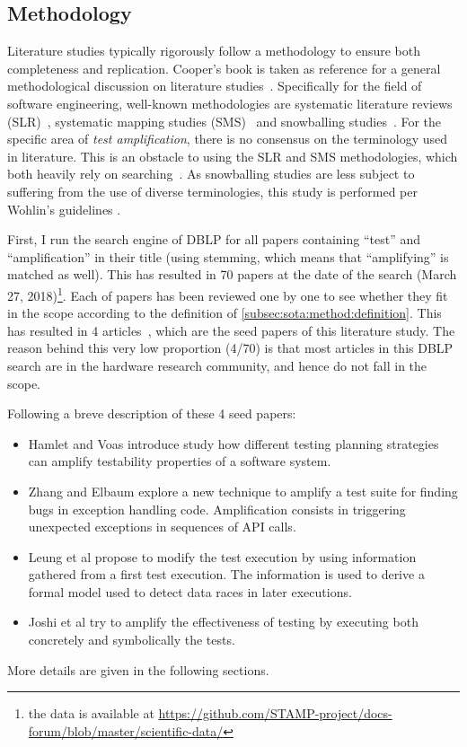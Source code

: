\subsection{Methodology}
\label{subsec:sota:method:methodology}

Literature studies typically rigorously follow a methodology to ensure both completeness and replication. 
Cooper's book is taken as reference for a general methodological discussion on literature studies~\cite{cooper1998synthesizing}. 
Specifically for the field of software engineering, well-known methodologies are systematic literature reviews (SLR)~\cite{kitchenham2004procedures}, systematic mapping studies (SMS)~\cite{petersen2008systematic} and snowballing studies~\cite{wohlin2014guidelines}.
For the specific area of \emph{test amplification}, there is no consensus on the terminology used in literature. 
This is an obstacle to using the SLR and SMS methodologies, which both heavily rely on searching~\cite{Brereton2007}. 
As snowballing studies are less subject to suffering from the use of diverse terminologies, this study is performed per Wohlin's guidelines \cite{wohlin2014guidelines,jalali2012systematic}.

First, I run the search engine of DBLP for all papers containing ``test'' and ``amplification'' in their title (using stemming, which means that ``amplifying'' is matched as well).
This has resulted in 70 papers at the date of the search (March 27, 2018)\footnote{the data is available at \url{https://github.com/STAMP-project/docs-forum/blob/master/scientific-data/}}.
Each of papers has been reviewed one by one to see whether they fit in the scope according to the definition of \autoref{subsec:sota:method:definition}. 
This has resulted in 4 articles~\cite{HamletV93,zhang2012,leung12,Joshi07}, which are the seed papers of this literature study. 
The reason behind this very low proportion (4/70) is that most articles in this DBLP search are in the hardware research community, and hence do not fall in the scope.

Following a breve description of these 4 seed papers:
\begin{itemize}
	\item \cite{HamletV93} Hamlet and Voas introduce study how different testing planning strategies can amplify testability properties of a software system.
	\item \cite{zhang2012} Zhang and Elbaum explore a new technique to amplify a test suite for finding bugs in exception handling code. Amplification consists in triggering unexpected exceptions in sequences of API calls.
	\item \cite{leung12} Leung et al propose to modify the test execution by using information gathered from a first test execution. The information is used to derive a formal model used to detect data races in later executions.
	\item \cite{Joshi07} Joshi et al  try to amplify the effectiveness of testing by executing both concretely and symbolically the tests.
\end{itemize}
More details are given in the following sections.

